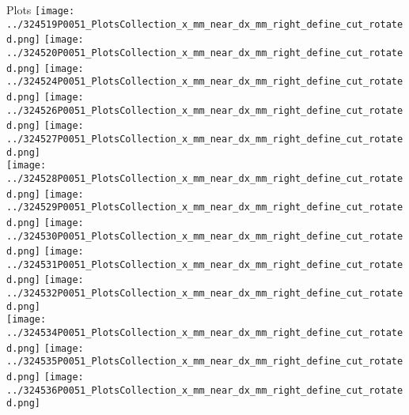 \documentclass{beamer}
\begin{document}
\begin{frame}
\begin{block}{Plots}
                \texttt{[image: ../324519P0051\_PlotsCollection\_x\_mm\_near\_dx\_mm\_right\_define\_cut\_rotated.png]}
                \texttt{[image: ../324520P0051\_PlotsCollection\_x\_mm\_near\_dx\_mm\_right\_define\_cut\_rotated.png]}
                \texttt{[image: ../324524P0051\_PlotsCollection\_x\_mm\_near\_dx\_mm\_right\_define\_cut\_rotated.png]}
                \texttt{[image: ../324526P0051\_PlotsCollection\_x\_mm\_near\_dx\_mm\_right\_define\_cut\_rotated.png]}
                \texttt{[image: ../324527P0051\_PlotsCollection\_x\_mm\_near\_dx\_mm\_right\_define\_cut\_rotated.png]}\\
                \texttt{[image: ../324528P0051\_PlotsCollection\_x\_mm\_near\_dx\_mm\_right\_define\_cut\_rotated.png]}
                \texttt{[image: ../324529P0051\_PlotsCollection\_x\_mm\_near\_dx\_mm\_right\_define\_cut\_rotated.png]}
                \texttt{[image: ../324530P0051\_PlotsCollection\_x\_mm\_near\_dx\_mm\_right\_define\_cut\_rotated.png]}
                \texttt{[image: ../324531P0051\_PlotsCollection\_x\_mm\_near\_dx\_mm\_right\_define\_cut\_rotated.png]}
                \texttt{[image: ../324532P0051\_PlotsCollection\_x\_mm\_near\_dx\_mm\_right\_define\_cut\_rotated.png]}\\
                \texttt{[image: ../324534P0051\_PlotsCollection\_x\_mm\_near\_dx\_mm\_right\_define\_cut\_rotated.png]}
                \texttt{[image: ../324535P0051\_PlotsCollection\_x\_mm\_near\_dx\_mm\_right\_define\_cut\_rotated.png]}
                \texttt{[image: ../324536P0051\_PlotsCollection\_x\_mm\_near\_dx\_mm\_right\_define\_cut\_rotated.png]}

        \end{block}
\end{frame}
\end{document}

